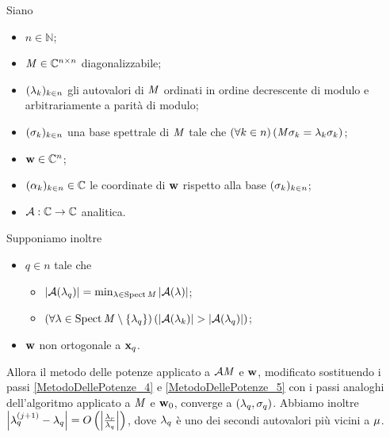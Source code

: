 \begin{Theorem}
  Siano
  \begin{itemize}
    \item $n \in \mathbb{N}$;
    \item $\mathit{M} \in \mathbb{C}^{n \times n}$ diagonalizzabile;
    \item $(\lambda_k)_{k \in n}$ gli autovalori di $\mathit{M}$ ordinati in ordine
      decrescente di modulo e arbitrariamente a parit\`a di modulo;
    \item $(\sigma_k)_{k \in n}$ una base spettrale di $\mathit{M}$ tale
      che $\left ( \forall k \in n \right ) \left ( \mathit{M} \sigma_k = \lambda_k \sigma_k \right )$;
    \item $\mathbf{w} \in \mathbb{C}^n$;
    \item $(\alpha_k)_{k \in n} \in \mathbb{C}$ le coordinate di $\mathbf{w}$
      rispetto alla base $(\sigma_k)_{k \in n}$;
    \item $\mathcal{A}: \mathbb{C} \rightarrow \mathbb{C}$ analitica.
  \end{itemize}
  Supponiamo inoltre
  \begin{itemize}
    \item $q \in n$ tale che
    \begin{itemize}
      \item $\left \lvert \mathcal{A}(\lambda_q) \right \rvert
            = \min_{\lambda \in \operatorname{Spect}{\mathit{M}}}
                \left \lvert \mathcal{A}(\lambda) \right \rvert$;
      \item $\left ( \forall \lambda \in \operatorname{Spect}{\mathit{M}} \setminus
                                \lbrace \lambda_q \rbrace \right ) \left ( 
              \left \lvert \mathcal{A}(\lambda_k) \right \rvert >
              \left \lvert \mathcal{A}(\lambda_q) \right \rvert \right )$;
    \end{itemize}
    \item $\mathbf{w}$ non ortogonale a $\Eigenvector_q$.
  \end{itemize}
  Allora il metodo delle potenze applicato a
  $\mathcal{A}{\mathit{M}}$ e $\mathbf{w}$, modificato sostituendo i passi
  \ref{MetodoDellePotenze_4} e \ref{MetodoDellePotenze_5} con
  i passi analoghi dell'algoritmo applicato a $\mathit{M}$ e $\mathbf{w}_0$,
  converge a $(\lambda_q,\sigma_q)$.
  Abbiamo inoltre
  $\left \lvert \lambda_q^{(j + 1)} - \lambda_q \right \rvert
  = O \left ( \left \lvert \frac{\lambda_r}{\lambda_q} \right \rvert \right )$,
  dove $\lambda_q$ \`e uno dei secondi autovalori pi\`u vicini
  a $\mu$.
\end{Theorem}

